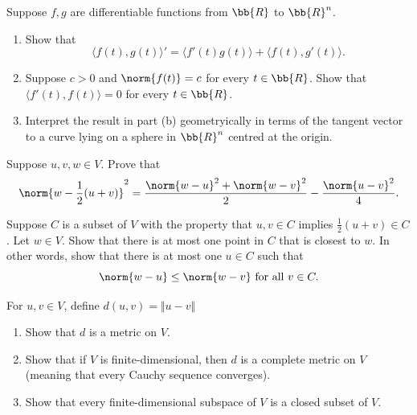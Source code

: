 \documentclass[12pt,letterpaper]{hmcpset}
\begin{document}
\pagebreak

\begin{problem}[26]
	Suppose $f, g$ are differentiable functions from $\bb{R}$ to $\bb{R}^n$.
	\begin{enumerate}
		\item Show that
			\[
				\langle f(t), g(t) \rangle' = \langle f'(t) g(t) \rangle + \langle f(t), g'(t) \rangle.
			\]
		\item Suppose $c > 0$ and $\norm{f(t)} = c$ for every $t \in \bb{R}$. Show that $\langle f'(t), f(t) \rangle = 0$ for every $t \in \bb{R}$.
		\item Interpret the result in part (b) geometryically in terms of the tangent vector to a curve lying on a sphere in $\bb{R}^n$ centred at the origin.
	\end{enumerate}
\end{problem}

\pagebreak

\begin{problem}[27]
	Suppose $u, v, w \in V$. Prove that
	\[
		\norm{w - \frac{1}{2}(u + v)}^2 = \frac{\norm{w - u}^2 + \norm{w - v}^2}{2} - \frac{\norm{u - v}^2}{4}.
	\]
\end{problem}

\pagebreak

\begin{problem}[28]
Suppose $C$ is a subset of $V$ with the property that $u, v \in C$ implies $\frac{1}{2} (u + v) \in C$. Let $w \in V$. Show that there is at most one point in $C$ that is closest to $w$. In other words, show that there is at most one $u \in C$ such that
	\[
		\norm{w - u} \le \norm{w - v} \text{ for all } v \in C.
	\]
\end{problem}

\pagebreak

\begin{problem}[29]
    For \( u , v \in V \), define \( d(u, v) = \Vert u - v \Vert \)
    \begin{enumerate}
        \item Show that $d$ is a metric on $V$.
        \item Show that if $V$ is finite-dimensional, then $d$ is a complete metric on $V$ (meaning that every Cauchy sequence converges).
        \item Show that every finite-dimensional subspace of $V$ is a closed subset of $V$.
    \end{enumerate}
\end{problem}
\end{document}
